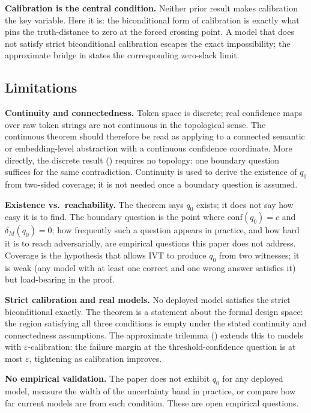 \documentclass[10pt]{article}
\newcommand{\conf}{\mathrm{conf}}
\begin{document}
\textbf{Calibration is the central condition.}
Neither prior result makes calibration the key variable. Here it is: the
biconditional form of calibration is exactly what pins the truth-distance
to zero at the forced crossing point. A model that does not satisfy strict
biconditional calibration escapes the exact impossibility; the approximate
bridge in  states the corresponding zero-slack limit.

\subsection{Limitations}

\textbf{Continuity and connectedness.} Token space is discrete; real
confidence maps over raw token strings are not continuous in the topological
sense. The continuous theorem should therefore be read as applying to a
connected semantic or embedding-level abstraction with a continuous confidence
coordinate. More directly, the discrete result ()
requires no topology: one boundary question suffices for the same
contradiction. Continuity is used to derive the existence of $q_0$ from
two-sided coverage; it is not needed once a boundary question is assumed.

\textbf{Existence vs.\ reachability.} The theorem says $q_0$ exists; it
does not say how easy it is to find. The boundary question is the point
where $\conf(q_0) = c$ and $\delta_M(q_0) = 0$; how frequently such a
question appears in practice, and how hard it is to reach adversarially,
are empirical questions this paper does not address. Coverage is the
hypothesis that allows IVT to produce $q_0$ from two witnesses; it is
weak (any model with at least one correct and one wrong answer satisfies
it) but load-bearing in the proof.

\textbf{Strict calibration and real models.} No deployed model satisfies
the strict biconditional exactly. The theorem is a statement about the
formal design space: the region satisfying all three conditions is empty
under the stated continuity and connectedness assumptions.
The approximate trilemma () extends this to models with
$\varepsilon$-calibration: the failure margin at the threshold-confidence
question is at most $\varepsilon$, tightening as calibration improves.

\textbf{No empirical validation.} The paper does not exhibit $q_0$ for
any deployed model, measure the width of the uncertainty band in practice,
or compare how far current models are from each condition. These are open
empirical questions.
\end{document}
